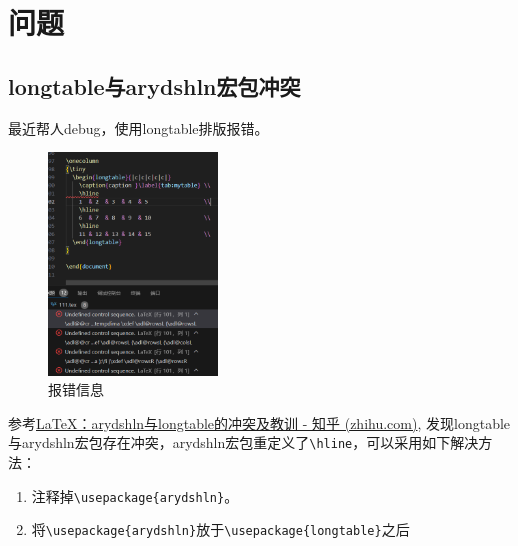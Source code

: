 \section{问题}

\subsection{longtable与arydshln宏包冲突}\label{subsec:longtable-arydshln-conflict}
最近帮人debug，使用longtable排版报错。
\begin{figure}[!h]
    \centering
    \includegraphics[width=0.4\textwidth]{figure/chap-tab/ary1.png}
    \caption{报错信息}
\end{figure}

参考\href{https://zhuanlan.zhihu.com/p/667681242}{LaTeX：arydshln与longtable的冲突及教训 - 知乎 (zhihu.com)}, 发现longtable与arydshln宏包存在冲突，arydshln宏包重定义了\lstinline{\hline}，可以采用如下解决方法：
\begin{enumerate}
    \item 注释掉\lstinline|\usepackage{arydshln}|。
    \item 将\lstinline|\usepackage{arydshln}|放于\lstinline|\usepackage{longtable}|之后
\end{enumerate}
